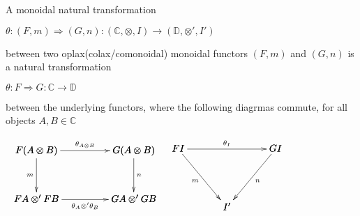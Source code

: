 \begin{definition}
\label{def:oplax_monoidal_natural_transformation}
    A monoidal natural transformation
    \begin{center}
        \begin{math}
            \theta : (F,m) \Rightarrow (G,n) : (\mathbb{C}, \otimes, I) \rightarrow (\mathbb{D}, \otimes ', I')
        \end{math}
    \end{center}
    between two oplax(colax/comonoidal) monoidal functors $(F,m)$ and $(G,n)$ is a natural transformation
    \begin{center}
        \begin{math}
            \theta : F \Rightarrow G : \mathbb{C} \rightarrow \mathbb{D}
        \end{math}
    \end{center}
    between the underlying functors, where the following diagrmas commute, for all objects $A,B \in \mathbb{C}$
    \begin{center}
        \begin{math}
            \begin{array}{rl}
                \bfig
                    \square<1000,500>[
                        F(A \otimes B)`
                        G(A \otimes B)`
                        FA \otimes ' FB`
                        GA \otimes ' GB;
                        \theta_{A \otimes B}`
                        m`
                        n`
                        \theta_A \otimes ' \theta_B
                    ]
                \efig
                &
                \bfig
                    \Vtriangle<500,600>[
                        FI`
                        GI`
                        I';
                        \theta_I`
                        m`
                        n
                    ]
                \efig
            \end{array}
        \end{math}
    \end{center}
    \cite{mellies2009}
\end{definition}


